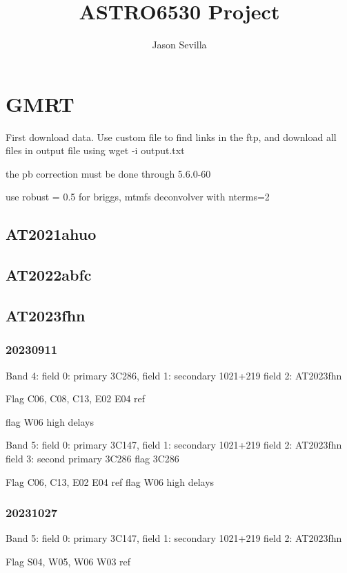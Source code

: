 \documentclass[twocolumn,twocolappendix]{aastex631}
\begin{document}
\title{ASTRO6530 Project}



\author{Jason Sevilla}





\section{GMRT}
First download data.  Use custom file to find links in the ftp, and download all files in output file using wget -i output.txt

the pb correction must be done through 5.6.0-60



use robust = 0.5 for briggs, mtmfs deconvolver with nterms=2

\subsection{AT2021ahuo}

\subsection{AT2022abfc}

\subsection{AT2023fhn}
\subsubsection{20230911}

Band 4:
field 0: primary 3C286,
field 1: secondary 1021+219
field 2: AT2023fhn

Flag C06, C08, C13, E02
E04 ref

flag W06 high delays


Band 5:
field 0: primary 3C147,
field 1: secondary 1021+219
field 2: AT2023fhn
field 3: second primary 3C286
flag 3C286

Flag C06, C13, E02
E04 ref
flag W06 high delays

\subsubsection{20231027} %


Band 5:
field 0: primary 3C147,
field 1: secondary 1021+219
field 2: AT2023fhn

Flag S04, W05, W06
W03 ref
\end{document}
